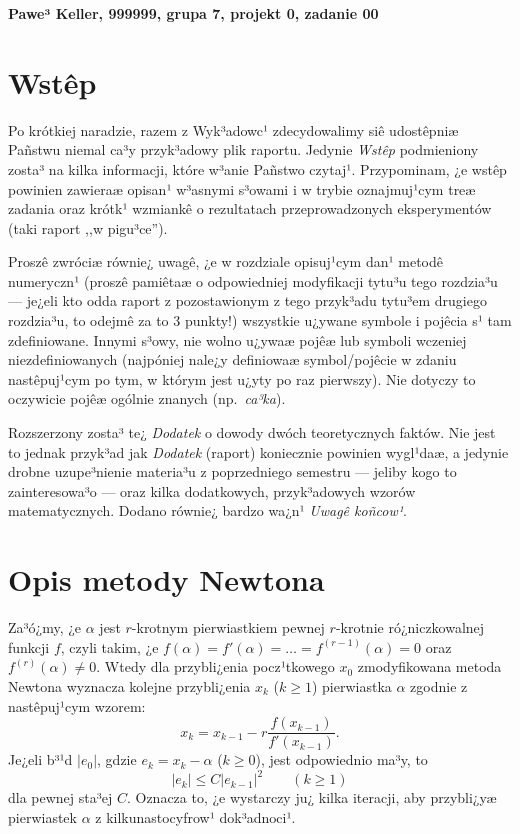 \documentclass[a4paper,12pt]{article}
\begin{document}
\def\tablename{Tabela} %


\noindent
\textbf{Pawe³ Keller, 999999, grupa 7, projekt 0, zadanie 00}


\section*{Wstêp}
Po krótkiej naradzie, razem z Wyk³adowc¹ zdecydowalimy siê udostêpniæ
Pañstwu niemal ca³y przyk³adowy plik raportu. Jedynie \emph{Wstêp} podmieniony
zosta³ na kilka informacji, które w³anie Pañstwo czytaj¹. Przypominam, ¿e wstêp
powinien zawieraæ opisan¹ w³asnymi s³owami i w trybie oznajmuj¹cym treæ
zadania oraz krótk¹ wzmiankê o rezultatach przeprowadzonych
eksperymentów (taki raport ,,w pigu³ce'').

Proszê zwróciæ równie¿ uwagê, ¿e w rozdziale opisuj¹cym dan¹ metodê numeryczn¹
(proszê pamiêtaæ o odpowiedniej modyfikacji tytu³u tego rozdzia³u --- je¿eli kto
odda raport z pozostawionym z tego przyk³adu tytu³em drugiego rozdzia³u,
to odejmê za to 3 punkty!) wszystkie u¿ywane symbole i pojêcia s¹
tam zdefiniowane. Innymi s³owy, nie wolno u¿ywaæ pojêæ lub symboli
wczeniej niezdefiniowanych (najpóniej nale¿y definiowaæ symbol/pojêcie
w zdaniu nastêpuj¹cym po tym, w którym jest u¿yty po raz pierwszy).
Nie dotyczy to oczywicie pojêæ ogólnie znanych (np.\ \emph{ca³ka}).

Rozszerzony zosta³ te¿ \emph{Dodatek} o dowody dwóch teoretycznych faktów.
Nie jest to jednak przyk³ad jak \emph{Dodatek} (raport) koniecznie powinien wygl¹daæ,
a jedynie drobne uzupe³nienie materia³u z poprzedniego semestru --- jeliby
kogo to zainteresowa³o --- oraz kilka dodatkowych, przyk³adowych wzorów
matematycznych. Dodano równie¿ bardzo wa¿n¹ \emph{Uwagê koñcow¹}.


\section*{Opis metody Newtona}
Za³ó¿my, ¿e $\alpha$ jest $r$-krotnym pierwiastkiem pewnej $r$-krotnie
ró¿niczkowalnej funkcji $f$, czyli takim, ¿e
$f(\alpha) = f'(\alpha) = \dots = f^{(r-1)}(\alpha)=0$
oraz $f^{(r)}(\alpha) \neq 0$. Wtedy dla przybli¿enia pocz¹tkowego
$x_0$ zmodyfikowana metoda Newtona wyznacza kolejne przybli¿enia $x_k$ ($k\geq 1$)
pierwiastka $\alpha$ zgodnie z nastêpuj¹cym wzorem:
\begin{equation}
\label{NewtonFormula}
  x_k = x_{k-1} - r \frac{f(x_{k-1})}{f'(x_{k-1})}.
\end{equation}
Je¿eli b³¹d $|e_0|$, gdzie $e_k = x_k - \alpha$ ($k \geq 0$), jest odpowiednio
ma³y, to
$$ %
  |e_k| \leq C |e_{k-1}|^2 \qquad (k \geq 1)
$$  
dla pewnej sta³ej $C$. Oznacza to, ¿e wystarczy ju¿ kilka iteracji, aby przybli¿yæ
pierwiastek $\alpha$ z kilkunastocyfrow¹ dok³adnoci¹.
\end{document}
